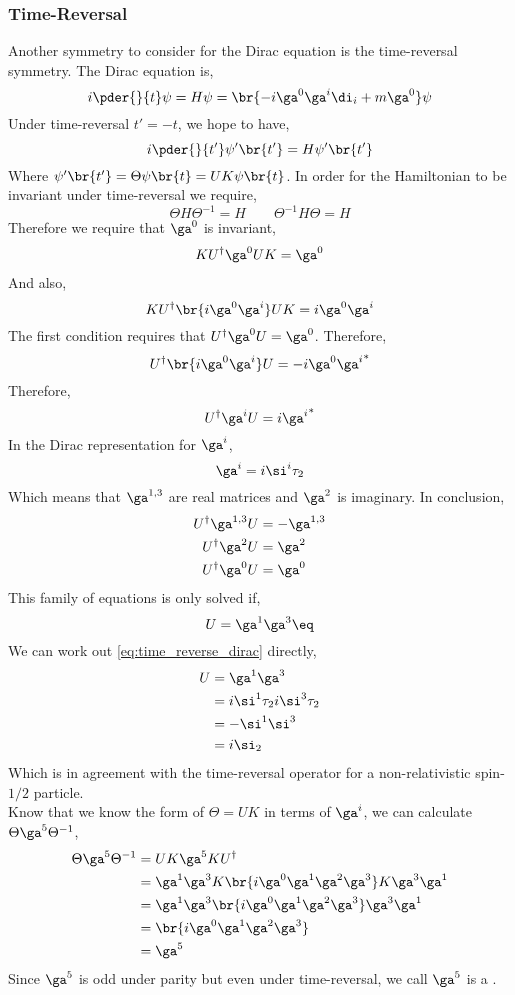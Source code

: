 \documentclass{article}
\begin{document}
\subsubsection{Time-Reversal}
Another symmetry to consider for the Dirac equation is the time-reversal symmetry. The Dirac equation is,
\[ i \pder{}{t} \psi = H \psi = \br{-i\ga^{0} \ga^{i} \di_{i} + m \ga^{0}} \psi \]
Under time-reversal $t' = -t$, we hope to have,
\[ i \pder{}{t'} \psi'\br{t'} = H \psi'\br{t'} \]
Where $\psi'\br{t'} = \Theta \psi\br{t} = U K \psi\br{t}$. In order for the Hamiltonian to be invariant under time-reversal we require,
\[ \Theta H \Theta^{-1} = H \qquad \Theta^{-1} H \Theta = H \]
Therefore we require that $\ga^{0}$ is invariant,
\begin{align*}
KU^{\dagger} \ga^{0} U K = \ga^{0} \\
\end{align*}
And also,
\[ K U^{\dagger} \br{i \ga^{0} \ga^{i}} UK = i \ga^{0} \ga^{i} \]
The first condition requires that $U^{\dagger} \ga^{0} U = \ga^{0}$. Therefore,
\[ U^{\dagger} \br{i \ga^{0} \ga^{i}} U = - i \ga^{0} {\ga^{i}}^* \]
Therefore,
\[ U^{\dagger} \ga^{i} U = i {\ga^{i}}^{*} \]
In the Dirac representation for $\ga^{i}$,
\[ \ga^{i} = i \si^{i} \tau_2 \]
Which means that $\ga^{1,3}$ are real matrices and $\ga^{2}$ is imaginary. In conclusion,
\begin{align*}
    U^{\dagger} \ga^{1,3} U &= - \ga^{1,3} \\
    U^{\dagger} \ga^{2} U &= \ga^{2} \\
    U^{\dagger} \ga^{0} U &= \ga^{0}
\end{align*}
This family of equations is only solved if,
\[ U = \ga^{1} \ga^{3} \eq \label{eq:time_reverse_dirac} \]
We can work out \cref{eq:time_reverse_dirac} directly,
\begin{align*}
U
&= \ga^{1} \ga^{3}\\
&= i \si^1 \tau_2 i \si^{3} \tau_2 \\
&= - \si^1 \si^{3} \\
&= i \si_2
\end{align*}
Which is in agreement with the time-reversal operator for a non-relativistic spin-$1/2$ particle.\\
Know that we know the form of $\Theta = UK$ in terms of $\ga^{i}$, we can calculate $\Theta \ga^{5} \Theta^{-1}$,
\begin{align*}
    \Theta \ga^{5} \Theta^{-1}
    &= UK \ga^{5} K U^{\dagger}  \\
    &= \ga^{1}\ga^{3}K \br{i \ga^{0}\ga^{1}\ga^{2}\ga^{3}} K \ga^{3} \ga^{1}  \\
    &= \ga^{1}\ga^{3} \br{i \ga^{0}\ga^{1}\ga^{2}\ga^{3}}  \ga^{3} \ga^{1}  \\
    &= \br{i \ga^{0}\ga^{1}\ga^{2}\ga^{3}} \\
    &= \ga^{5}
\end{align*}
Since $\ga^{5}$ is odd under parity but even under time-reversal, we call $\ga^{5}$ is a .
\end{document}
